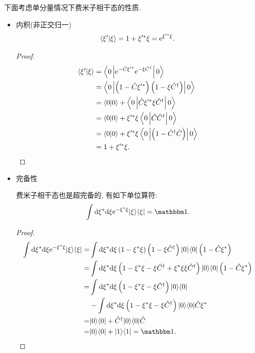 下面考虑单分量情况下费米子相干态的性质.
\begin{itemize}
\item 内积(非正交归一)
\begin{equation}
\langle\xi^{\prime} | \xi \rangle=1+\xi^{\prime*} \xi=\mathrm{e}^{\xi^{\prime*} \xi}.
\end{equation}
\begin{proof}
\begin{align}
\langle\xi^{\prime} | \xi \rangle &=\left\langle 0\left|\mathrm{e}^{-\hat{C} \xi^{\prime*}} \mathrm{e}^{-\xi \hat{C}^{\dagger}}\right| 0\right\rangle\nonumber\\
&=\left\langle 0\left|\left(1-\hat{C} \xi^{\prime*}\right)\left(1-\xi \hat{C}^{\dagger}\right)\right| 0\right\rangle \nonumber\\
&=\langle 0 |0\rangle+\left\langle 0\left|\hat{C} \xi^{\prime*} \xi \hat{C}^{\dagger}\right| 0\right\rangle\nonumber\\
&=\langle 0 | 0\rangle+\xi^{\prime*} \xi\left\langle 0\left|\hat{C} \hat{C}^{\dagger}\right| 0\right\rangle \nonumber\\
&=\langle 0 | 0\rangle+\xi^{\prime*} \xi\left\langle 0\left|\left(1-\hat{C}^{\dagger} \hat{C}\right)\right| 0\right\rangle\nonumber\\
&=1+\xi^{\prime*} \xi .
\end{align}
\end{proof}
\item 完备性

费米子相干态也是超完备的, 有如下单位算符:
\begin{equation}
\int \mathrm{d} \xi^{*} \mathrm{d} \xi \e^{-\xi^{*} \xi}|\xi\rangle\langle\xi|=\mathbbm 1 .
\end{equation}
\begin{proof}
\begin{align}
\int \mathrm{d} \xi^{*} \mathrm{d} \xi \e^{-\xi^{*} \xi}|\xi\rangle\langle\xi| =&\int \mathrm{d} \xi^{*} \mathrm{d} \xi\left(1-\xi^{*} \xi\right)\left(1-\xi \hat{C}^{\dagger}\right)|0\rangle\langle 0|\left(1-\hat{C} \xi^{*}\right) \nonumber\\
=&\int \mathrm{d} \xi^{*} \mathrm{d} \xi\left(1-\xi^{*} \xi-\xi \hat{C}^{\dagger}+  \xi^{*} \xi \xi \hat{C}^{\dagger}  \right)|0\rangle\langle 0|\left(1-\hat{C} \xi^{*}\right) \nonumber\\
=&\int \mathrm{d} \xi^{*} \mathrm{d} \xi\left(1-\xi^{*} \xi-\xi \hat{C}^{\dagger}\right)|0\rangle\langle 0|\nonumber\\
&-\int \mathrm{d} \xi^{*} \mathrm{d} \xi\left(1-\xi^{*} \xi-\xi \hat{C}^{\dagger}\right)| 0\rangle\langle 0| \hat{C} \xi^{*} \nonumber\\
=&|0\rangle\langle 0|+\hat{C}^{\dagger}|0\rangle\langle 0|\hat{C} \nonumber\\
=&|0\rangle\langle 0|+|1\rangle\langle 1|=\mathbbm 1.
\end{align}
\end{proof}

\end{itemize}

